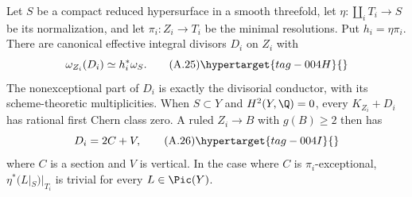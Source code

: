\begin{proposition}\hypertarget{tag-01BD}{}\label{cdp:st:A.5.3}

Let $S$ be a compact reduced hypersurface in a smooth threefold, let $\eta:\coprod_i T_i\to S$ be its normalization, and let $\pi_i:Z_i\to T_i$ be the minimal resolutions. Put $h_i=\eta\pi_i$. There are canonical effective integral divisors $D_i$ on $Z_i$ with
\[
 \omega_{Z_i}(D_i)\simeq h_i^*\omega_S.
 \tag{A.25}\hypertarget{tag-004H}{}\label{cdp:eq:A.25}
\]
The nonexceptional part of $D_i$ is exactly the divisorial conductor, with its scheme-theoretic multiplicities. When $S\subset Y$ and $H^2(Y,\Q)=0$, every $K_{Z_i}+D_i$ has rational first Chern class zero. A ruled $Z_i\to B$ with $g(B)\ge2$ then has
\[
 D_i=2C+V,
 \tag{A.26}\hypertarget{tag-004I}{}\label{cdp:eq:A.26}
\]
where $C$ is a section and $V$ is vertical. In the case where $C$ is $\pi_i$-exceptional, $\eta^*(L|_S)|_{T_i}$ is trivial for every $L\in\Pic(Y)$.
\end{proposition}
